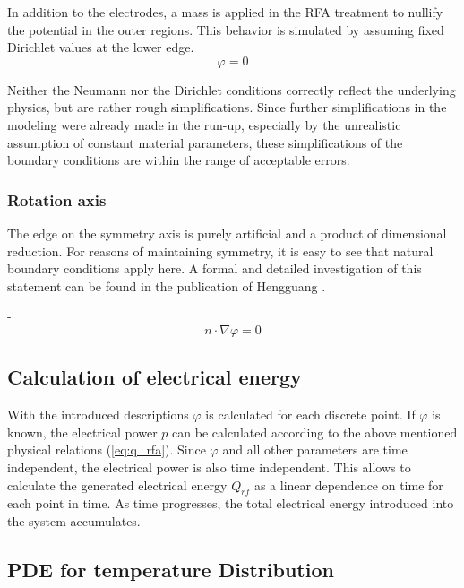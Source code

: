 \documentclass[parskip=half, titlepage=yes, 12pt, BCOR=12mm, DIV=calc]{scrartcl}
\begin{document}
In addition to the electrodes, a mass is applied in the RFA treatment to nullify the potential in the outer regions. This behavior is simulated by assuming fixed Dirichlet values at the lower edge.
\begin{equation}
    \varphi = 0
\end{equation}

Neither the Neumann nor the Dirichlet conditions correctly reflect the underlying physics, but are rather rough simplifications.
Since further simplifications in the modeling were already made in the run-up, especially by the unrealistic assumption of constant material parameters, these simplifications of the boundary conditions are within the range of acceptable errors.


\subsubsection{Rotation axis}

The edge on the symmetry axis is purely artificial and a product of dimensional reduction. For reasons of maintaining symmetry, it is easy to see that natural boundary conditions apply here.
A formal and detailed investigation of this statement can be found in the publication of Hengguang \cite{hengguang}. 

- \begin{equation}
    n \cdot \nabla \varphi = 0
\end{equation}



\subsection{Calculation of electrical energy}

With the introduced descriptions $\varphi$ is calculated for each discrete point. If $\varphi$ is known, the electrical power $p$ can be calculated according to the above mentioned physical relations (\ref{eq:q_rfa}). Since $\varphi$ and all other parameters are time independent, the electrical power is also time independent. This allows to calculate the generated electrical energy $Q_{rf}$ as a linear dependence on time for each point in time. As time progresses, the total electrical energy introduced into the system accumulates. 

\subsection{PDE for temperature Distribution}
\end{document}
